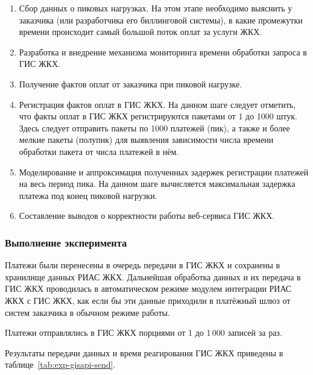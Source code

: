 \begin{enumerate}
	\item Сбор данных о пиковых нагрузках. На этом этапе необходимо выяснить у заказчика (или разработчика его биллинговой системы), в какие промежутки времени происходит самый большой поток оплат за услуги ЖКХ.
	\item Разработка и внедрение механизма мониторинга времени обработки запроса в ГИС ЖКХ.
	\item Получение фактов оплат от заказчика при пиковой нагрузке.
	\item Регистрация фактов оплат в ГИС ЖКХ. На данном шаге следует отметить, что факты оплат в ГИС ЖКХ регистрируются пакетами от 1 до 1000 штук. Здесь следует отправить пакеты по 1000 платежей (пик), а также и более мелкие пакеты (полупик) для выявления зависимости числа времени обработки пакета от числа платежей в нём.
	\item Моделирование и аппроксимация полученных задержек регистрации платежей на весь период пика. На данном шаге вычисляется максимальная задержка платежа под конец пиковой нагрузки.
	\item Составление выводов о корректности работы веб-сервиса ГИС ЖКХ.
\end{enumerate}

\subsubsection*{Выполнение эксперимента}

Платежи были перенесены в очередь передачи в ГИС ЖКХ и сохранены в хранилище данных РИАС ЖКХ.
Дальнейшая обработка данных и их передача в ГИС ЖКХ проводилась в автоматическом режиме модулем интеграции РИАС ЖКХ с ГИС ЖКХ, как если бы эти данные приходили в платёжный шлюз от систем заказчика в обычном режиме работы.

Платежи отправлялись в ГИС ЖКХ порциями от 1 до 1\,000 записей за раз. 

Результаты передачи данных и время реагирования ГИС ЖКХ приведены в таблице~\ref{tab:exp-gisapi-send}.

